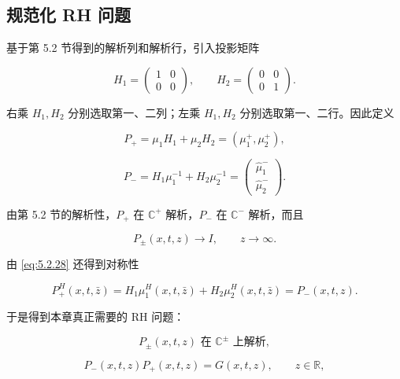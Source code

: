 \documentclass[
    lang=cn,
    scheme=chinese,
    mode=simple,
    device=normal,
    color=blue,
    math=cm,
    thmcnt=section,
    12pt,
    nowatermark
]{elegantbook}
\begin{document}
\subsection{规范化 RH 问题}

基于第 5.2 节得到的解析列和解析行，引入投影矩阵

\begin{equation}
    H_1=
    \begin{pmatrix}
        1 & 0 \\
        0 & 0
    \end{pmatrix},
    \qquad
    H_2=
    \begin{pmatrix}
        0 & 0 \\
        0 & 1
    \end{pmatrix}.
    \tag{5.3.1}
    \label{eq:5.3.1}
\end{equation}

右乘 $H_1,H_2$ 分别选取第一、二列；左乘 $H_1,H_2$ 分别选取第一、二行。因此定义

\[
    P_+
    =
    \mu_1H_1+\mu_2H_2
    =
    (\mu_1^+,\mu_2^+),
\]

\[
    P_-
    =
    H_1\mu_1^{-1}+H_2\mu_2^{-1}
    =
    \begin{pmatrix}
        \widehat\mu_1^- \\
        \widehat\mu_2^-
    \end{pmatrix}.
\]

由第 5.2 节的解析性，$P_+$ 在 $\mathbb{C}^+$ 解析，$P_-$ 在 $\mathbb{C}^-$ 解析，而且

\[
    P_\pm(x,t,z)\to I,\qquad z\to\infty.
\]

由 \eqref{eq:5.2.28} 还得到对称性

\begin{equation}
    P_+^H(x,t,\bar z)
    =
    H_1\mu_1^H(x,t,\bar z)
    +
    H_2\mu_2^H(x,t,\bar z)
    =
    P_-(x,t,z).
    \tag{5.3.3}
    \label{eq:5.3.3}
\end{equation}

于是得到本章真正需要的 RH 问题：

\begin{equation}
    P_\pm(x,t,z)\text{ 在 }\mathbb{C}^\pm\text{ 上解析},
    \tag{5.3.4}
    \label{eq:5.3.4}
\end{equation}

\begin{equation}
    P_-(x,t,z)P_+(x,t,z)
    =
    G(x,t,z),
    \qquad z\in\mathbb{R},
    \tag{5.3.5}
    \label{eq:5.3.5}
\end{equation}
\end{document}
